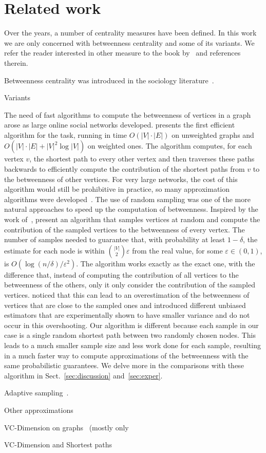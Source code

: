 \section{Related work}\label{sec:prevwork}
Over the years, a number of centrality measures have been defined. In this work
we are only concerned with betweenness centrality and some of its variants. We
refer the reader interested in other measure to the book by~\citet{Newman10} and
references therein.

Betweenness centrality was introduced in the sociology
literature~\citep{Anthonisse71,Freeman77}. 

Variants~\citep{Brandes08,DolevEP10,KourtellisASIT12,PfefferC12}

The need of fast algorithms to compute
the betweenness of vertices in a graph arose as large online social networks
developed. \citet{Brandes01} presents the first efficient algorithm for the
task, running in time $O(|V|\cdot|E|)$ on unweighted graphs and
$O(|V|\cdot|E|+|V|^2\log|V|)$ on weighted ones. The algorithm computes, for each
vertex $v$, the shortest path to every other vertex and then traverses these paths
backwards to efficiently compute the contribution of the shortest paths from $v$
to the betweenness of other vertices. For very large networks, the cost of this
algorithm would still be prohibitive in practice, so many approximation
algorithms were
developed~\citep{JacobKLPT05,BrandesP07,BaderKMM07,GeisbergerSS08,MaiyaBW10,LimMRT11}.
The use of random sampling was one of the more natural approaches to speed up
the computation of betweenness. Inspired by the work of~\citet{EppsteinW04},
\citet{JacobKLPT05,BrandesP07} present an algorithm that samples vertices at
random and compute the contribution of the sampled vertices to the betweenness
of every vertex. The number of samples needed to guarantee that, with
probability at least $1-\delta$, the estimate for each node is within
$\binom{|V|}{2}\varepsilon$ from the real value, for some $\varepsilon\in(0,1)$,
is $O(\log(n/\delta)/\varepsilon^2)$. The algorithm works exactly as the exact
one, with the difference that, instead of computing the contribution of all
vertices to the betweenness of the others, only it only consider the
contribution of the sampled vertices. \citet{GeisbergerSS08} noticed that this
can lead to an overestimation of the betweenness of vertices that are close to
the sampled ones and introduced different unbiased estimators that are
experimentally shown to have smaller variance and do not occur in this
overshooting. Our algorithm is different because each sample in our case is a
single random shortest path between two randomly chosen nodes. This leads to a
much smaller sample size and less work done for each sample, resulting in a much
faster way to compute approximations of the betweenness with the same
probabilistic guarantees. We delve more in the comparisons with these algorithm
in Sect.~\ref{sec:discussion} and~\ref{sec:exper}.

Adaptive sampling~\citep{BaderKMM07,MaiyaBW10,LimMRT11}.

Other approximations~\citep{GkorouPE10,PrountzosP13,SaryuceSKC13}

VC-Dimension on graphs~\citep{AnthonyBC95,KranakisKRUW97,MubayiZ07,YcartR07}
(mostly only~\citep{KranakisKRUW97}

VC-Dimension and Shortest paths~\citep{AbrahamDFGW11}

